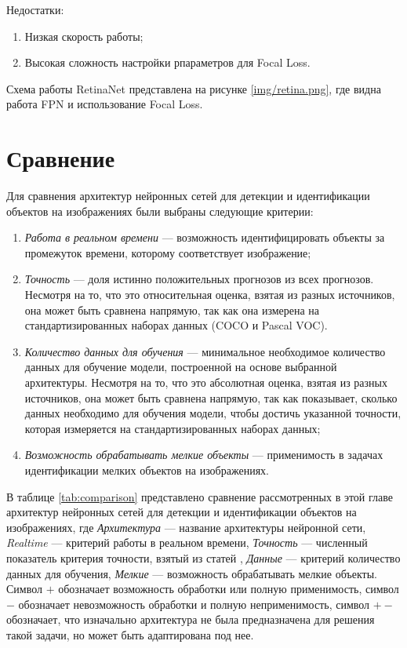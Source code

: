 Недостатки:
\begin{enumerate}
    \item Низкая скорость работы;
    \item Высокая сложность настройки рпараметров для Focal Loss.
\end{enumerate}

Схема работы RetinaNet представлена на рисунке \ref{img/retina.png}, где видна работа FPN и использование Focal Loss.


\section{Сравнение}
Для сравнения архитектур нейронных сетей для детекции и идентификации объектов на изображениях были выбраны следующие критерии:
\begin{enumerate}
\item \textit{Работа в реальном времени} --- возможность идентифицировать объекты за промежуток времени, которому соответствует изображение;
\item \textit{Точность} --- доля истинно положительных прогнозов из всех прогнозов. Несмотря на то, что это относительная оценка, взятая из разных источников, она может быть сравнена напрямую, так как она измерена на стандартизированных наборах данных (COCO и Pascal VOC).
\item \textit{Количество данных для обучения} --- минимальное необходимое количество данных для обучение модели, построенной на основе выбранной архитектуры. Несмотря на то, что это абсолютная оценка, взятая из разных источников, она может быть сравнена напрямую, так как показывает, сколько данных необходимо для обучения модели, чтобы достичь указанной точности, которая измеряется на стандартизированных наборах данных;
\item \textit{Возможность обрабатывать мелкие объекты} --- применимость в задачах идентификации мелких объектов на изображениях.
\end{enumerate}
В таблице \ref{tab:comparison} представлено сравнение рассмотренных в этой главе архитектур нейронных сетей для детекции и идентификации объектов на изображениях, где \textit{Архитектура} --- название архитектуры нейронной сети, \textit{Realtime} --- критерий работы в реальном времени, \textit{Точность} --- численный показатель критерия точности, взятый из статей \cite{ret, yolov11},   
 \textit{Данные} --- критерий количество данных для обучения, \textit{Мелкие} --- возможность обрабатывать мелкие объекты. Символ $+$ обозначает возможность обработки или полную применимость, символ $-$ обозначает невозможность обработки и полную неприменимость, символ $+-$ обозначает, что изначально архитектура не была предназначена для решения такой задачи, но может быть адаптирована под нее. 
